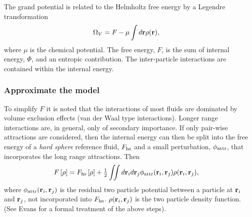 The grand potential is related to the Helmholtz free energy by a Legendre transformation
\begin{align}
  \Omega_V = F -  \mu \int d\textbf{r} \rho(\textbf{r}), \label{eqn:OmegaVDefn}
\end{align}
where $\mu$ is the chemical potential.
The free energy, $F$, is the sum of  internal energy, $\Phi$, and an  entropic contribution.
The inter-particle interactions are contained within the internal energy.

\subsubsection{Approximate the model}\label{sec:nuc:DFT:approx}
To simplify $F$ it is noted that  the interactions of most fluids are dominated  by volume exclusion effects (van der Waal type interactions).
Longer range interactions are, in general, only of secondary importance\cite{Oxtoby1992}.
If only pair-wise attractions are considered, then the internal energy can then be split into the 
free energy of a {\em hard sphere} reference fluid, $F_{\text{hs}}$ 
and a small perturbation, $\phi_{\text{attr}}$, that incorporates the long range attractions.
Then 
\begin{align}
   F\left[ \rho \right] = F_{\text{hs}}\left[ \rho \right] +\tfrac{1}{2}   \iint d \textbf{r}_i d\textbf{r}_j \phi_{\text{attr}}( \textbf{r}_i, \textbf{r}_j)\rho(\textbf{r}_i, \textbf{r}_j),  \label{eqn:F_pert}
\end{align}
where $\phi_{\text{attr}}(\textbf{r}_i, \textbf{r}_j)$ is the residual two particle potential between a particle at $\textbf{r}_i$ and $\textbf{r}_j$,
not incorporated into $F_{\text{hs}}$.
$\rho(\textbf{r}_i, \textbf{r}_j) $ is the two particle density function.
(See Evans\cite{Evans1992} for a formal treatment of the above steps).


